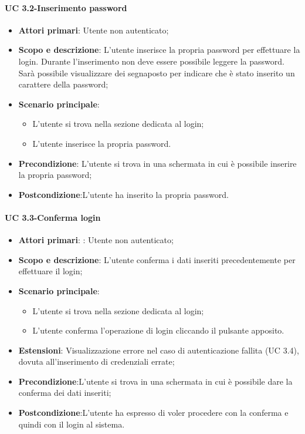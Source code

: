         \paragraph{UC 3.2-Inserimento password}
            \begin{itemize}
                \item \textbf{Attori primari}: Utente non autenticato;
                
                \item \textbf{Scopo e descrizione}: L'utente inserisce la propria password per effettuare la login. Durante l’inserimento non deve essere possibile leggere la password. Sarà possibile visualizzare
                dei segnaposto per indicare che è stato inserito un carattere della password; 
                \item \textbf{Scenario principale}: 
                    \begin{itemize}
                        \item L'utente si trova nella sezione dedicata al login;
                        \item L'utente inserisce la propria password.
                    \end{itemize}
                \item \textbf{Precondizione}: L'utente si trova in una schermata in cui è possibile inserire la propria password;
             \item \textbf{Postcondizione}:L'utente ha inserito la propria password.
           \end{itemize}
           
        \paragraph{UC 3.3-Conferma login}
            \begin{itemize}
                \item \textbf{Attori primari}: : Utente non autenticato;
                \item \textbf{Scopo e descrizione}: L'utente conferma i dati inseriti precedentemente per effettuare il login; 
                \item \textbf{Scenario principale}:
                    \begin{itemize}
                        \item L'utente si trova nella sezione dedicata al login;
                        \item L'utente conferma l'operazione di login cliccando il pulsante apposito.
                    \end{itemize}
                \item \textbf{Estensioni}: Visualizzazione errore nel caso di autenticazione fallita (UC 3.4), dovuta all'inserimento di credenziali errate;
                \item \textbf{Precondizione}:L'utente si trova in una schermata in cui è possibile dare la conferma dei dati inseriti;
                \item \textbf{Postcondizione}:L’utente ha espresso di voler procedere con la conferma e quindi con il login al sistema.
            \end{itemize}
        
